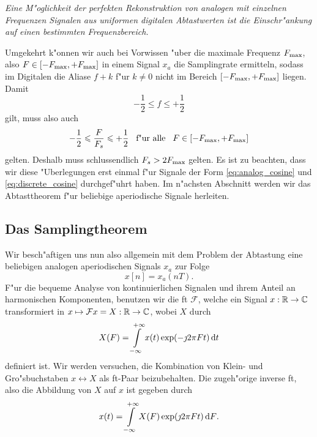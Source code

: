 \emph{Eine M"oglichkeit der perfekten Rekonstruktion von analogen mit einzelnen Frequenzen Signalen aus uniformen digitalen Abtastwerten ist die Einschr"ankung auf einen bestimmten Frequenzbereich.}

Umgekehrt k"onnen wir auch bei Vorwissen "uber die maximale Frequenz $F_{\rm max}$, also $F \in [-F_{\rm max},+F_{\rm max}]$ in einem Signal $x_a$ die Samplingrate ermitteln, sodass im Digitalen die Aliase $f + k$ f"ur $k \neq 0$ nicht im Bereich $[-F_{\rm max},+F_{\rm max}]$ liegen.
Damit
\[
    -\frac 12 \leqslant f \leqslant + \frac 12
\]
gilt, muss also auch
\[
    -\frac 12 \leqslant \frac{F}{F_s} \leqslant + \frac 12 {\hspace{3mm} \text{f"ur alle} \hspace{3mm}} F \in [-F_{\rm max},+F_{\rm max}]
\]
gelten.
Deshalb muss schlussendlich $F_s > 2 F_{\rm max}$ gelten.
Es ist zu beachten, dass wir diese "Uberlegungen erst einmal  f"ur Signale der Form \eqref{eq:analog_cosine} und \eqref{eq:discrete_cosine} durchgef"uhrt haben.
Im n"achsten Abschnitt werden wir das Abtasttheorem f"ur beliebige aperiodische Signale herleiten.
%
%
\subsection{Das Samplingtheorem}
%
Wir besch"aftigen uns nun also allgemein mit dem Problem der Abtastung eine beliebigen analogen aperiodischen Signals $x_a$ zur Folge
\[
    x[n] = x_a(nT).
\]
F"ur die bequeme Analyse von kontinuierlichen Signalen und ihrem Anteil an harmonischen Komponenten, benutzen wir die \gls{ft} $\mathcal{F}$, welche ein Signal $x : \mathbb{R} \rightarrow \mathbb{C}$ transformiert in $x \mapsto \mathcal{F} x = X : \mathbb{R} \rightarrow \mathbb{C}$, wobei $X$ durch
%
\begin{equation}\label{eq:sampling:fourier_trafo}
    X(F) = {\int\limits_{-\infty}^{+\infty}{x(t) \exp(-\jmath 2 \pi F t)}\,\mathrm{d}{t}}
\end{equation}
%
definiert ist.
Wir werden versuchen, die Kombination von Klein- und Gro"sbuchstaben $x \leftrightarrow X$ als \gls{ft}-Paar beizubehalten.
Die zugeh"orige inverse \gls{ft}, also die Abbildung von $X$ auf $x$ ist gegeben durch
%
\begin{equation}\label{eq:inv_fourier_trafo}
    x(t) = {\int\limits_{-\infty}^{+\infty}{X(F) \exp(\jmath 2 \pi F t)}\,\mathrm{d}{F}}.
\end{equation}


